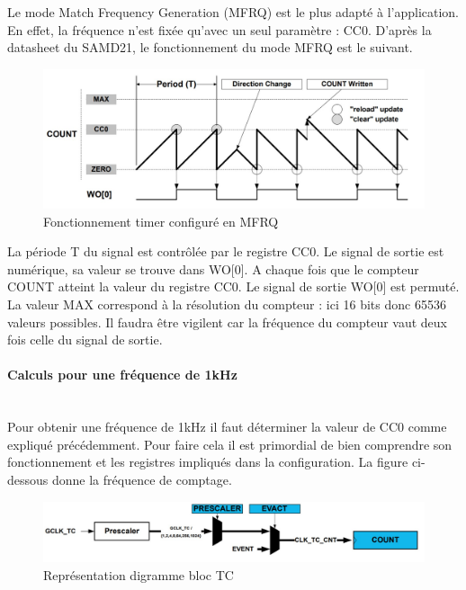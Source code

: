 \documentclass[a4paper]{article}
\begin{document}
	Le mode Match Frequency Generation (MFRQ) est le plus adapté à l'application. En effet, la fréquence n'est fixée qu'avec un seul paramètre : CC0. D'après la datasheet du SAMD21, le fonctionnement du mode MFRQ est le suivant. \\
	
	\begin{figure}[H]
		\centering
		\includegraphics[width=0.85\linewidth]{Match Frequency Operation.jpg}
		\caption{Fonctionnement timer configuré en MFRQ}
	\end{figure}
	La période T du signal est contrôlée par le registre CC0. Le signal de sortie est numérique, sa valeur se trouve dans WO[0]. A chaque fois que le compteur COUNT atteint la valeur du registre CC0.  Le signal de sortie WO[0] est permuté. La valeur MAX correspond à la résolution du compteur : ici 16 bits donc 65536 valeurs possibles. Il faudra être vigilent car la fréquence du compteur vaut deux fois celle du signal de sortie.\\
	
	\paragraph{Calculs pour une fréquence de 1kHz}
	~~\\
	Pour obtenir une fréquence de 1kHz il faut déterminer la valeur de CC0 comme expliqué précédemment. Pour faire cela il est primordial de bien comprendre son fonctionnement et les registres impliqués dans la configuration. La figure ci-dessous donne la fréquence de comptage. \\
	
	\begin{figure}[H]
		\centering
		\includegraphics[width=12cm]{prescaler.jpg}
		\caption{Représentation digramme bloc TC}
	\end{figure}
	
\end{document}
